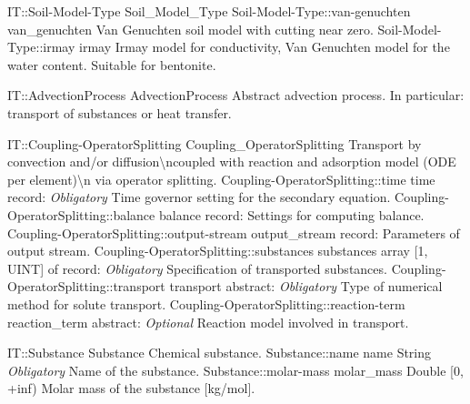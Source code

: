 \begin{SelectionType}
	{IT::Soil-Model-Type}
	{Soil{\_}Model{\_}Type}
	{}
		\SelectionItem
			{Soil-Model-Type::van-genuchten}
			{van{\_}genuchten}
			{{{Van Genuchten soil model with cutting near zero.}%
}}
		\SelectionItem
			{Soil-Model-Type::irmay}
			{irmay}
			{{{Irmay model for conductivity, Van Genuchten model for the water content.
Suitable for bentonite.}%
}}
\end{SelectionType}
\begin{AbstractType}
	{IT::AdvectionProcess}
	{AdvectionProcess}
	{}
	{{{Abstract advection process.
In particular: transport of substances or heat transfer.}%
}}
\end{AbstractType}
\begin{RecordType}
	{IT::Coupling-OperatorSplitting}
	{Coupling{\_}OperatorSplitting}
	{}%
	{}%
	{{{Transport by convection and/or diffusion{\textbackslash}ncoupled with reaction and adsorption model (ODE per element){\textbackslash}n via operator splitting.}%
}}
		\RecKey
			{Coupling-OperatorSplitting::time}
			{time}
			{{record: }}{}
			{ \it{Obligatory}}
			{{{Time governor setting for the secondary equation.}%
}}
		\RecKey
			{Coupling-OperatorSplitting::balance}
			{balance}
			{{record: }}{}
			{ \ValueDefault{{\{}{\}}}}
			{{{Settings for computing balance.}%
}}
		\RecKey
			{Coupling-OperatorSplitting::output-stream}
			{output{\_}stream}
			{{record: }}{}
			{ \ValueDefault{{\{}{\}}}}
			{{{Parameters of output stream.}%
}}
		\RecKey
			{Coupling-OperatorSplitting::substances}
			{substances}
			{{array [1, UINT] of }{record: }}{}
			{ \it{Obligatory}}
			{{{Specification of transported substances.}%
}}
		\RecKey
			{Coupling-OperatorSplitting::transport}
			{transport}
			{{abstract: }}{}
			{ \it{Obligatory}}
			{{{Type of numerical method for solute transport.}%
}}
		\RecKey
			{Coupling-OperatorSplitting::reaction-term}
			{reaction{\_}term}
			{{abstract: }}{}
			{ \it{Optional}}
			{{{Reaction model involved in transport.}%
}}
\end{RecordType}
\begin{RecordType}
	{IT::Substance}
	{Substance}
	{}%
	{}%
	{{{Chemical substance.}%
}}
		\RecKey
			{Substance::name}
			{name}
			{{String}}{}
			{ \it{Obligatory}}
			{{{Name of the substance.}%
}}
		\RecKey
			{Substance::molar-mass}
			{molar{\_}mass}
			{{Double [0, +inf)}}{}
			{ }
			{{{Molar mass of the substance [kg/mol].}%
}}
\end{RecordType}

